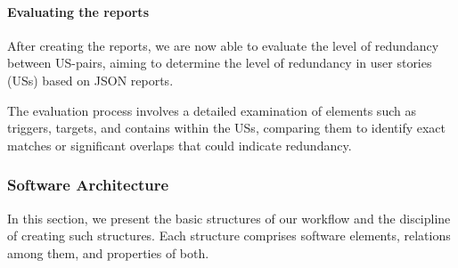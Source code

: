 \paragraph{Evaluating the reports} After creating the reports, we are now able to evaluate the level of redundancy between US-pairs, aiming to determine the level of redundancy in user stories (USs) based on JSON reports. 

The evaluation process involves a detailed examination of elements such as triggers, targets, and contains within the USs, comparing them to identify exact matches or significant overlaps that could indicate redundancy.

\subsubsection*{Software Architecture}\label{architectur}
In this section, we present the basic structures of our workflow and the discipline of creating such structures. Each structure comprises software elements, relations among them, and properties of both.
